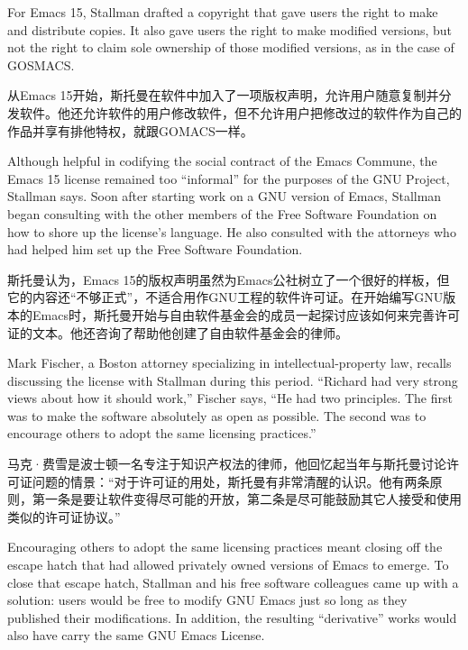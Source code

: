 \ifdefined\eng
For Emacs 15, Stallman drafted a copyright that gave users the right to make and distribute copies. It also gave users the right to make modified versions, but not the right to claim sole ownership of those modified versions, as in the case of GOSMACS.
\fi

\ifdefined\chs
从Emacs 15开始，斯托曼在软件中加入了一项版权声明，允许用户随意复制并分发软件。他还允许软件的用户修改软件，但不允许用户把修改过的软件作为自己的作品并享有排他特权，就跟GOMACS一样。
\fi

\ifdefined\eng
Although helpful in codifying the social contract of the Emacs Commune, the Emacs 15 license remained too ``informal'' for the purposes of the GNU Project, Stallman says. Soon after starting work on a GNU version of Emacs, Stallman began consulting with the other members of the Free Software Foundation on how to shore up the license's language. He also consulted with the attorneys who had helped him set up the Free Software Foundation.
\fi

\ifdefined\chs
斯托曼认为，Emacs 15的版权声明虽然为Emacs公社树立了一个很好的样板，但它的内容还``不够正式''，不适合用作GNU工程的软件许可证。在开始编写GNU版本的Emacs时，斯托曼开始与自由软件基金会的成员一起探讨应该如何来完善许可证的文本。他还咨询了帮助他创建了自由软件基金会的律师。
\fi

\ifdefined\eng
Mark Fischer, a Boston attorney specializing in intellectual-property law, recalls discussing the license with Stallman during this period. ``Richard had very strong views about how it should work,'' Fischer says, ``He had two principles. The first was to make the software absolutely as open as possible. The second was to encourage others to adopt the same licensing practices.''
\fi

\ifdefined\chs
马克·费雪是波士顿一名专注于知识产权法的律师，他回忆起当年与斯托曼讨论许可证问题的情景：``对于许可证的用处，斯托曼有非常清醒的认识。他有两条原则，第一条是要让软件变得尽可能的开放，第二条是尽可能鼓励其它人接受和使用类似的许可证协议。''
\fi

\ifdefined\eng
Encouraging others to adopt the same licensing practices meant closing off the escape hatch that had allowed privately owned versions of Emacs to emerge. To close that escape hatch, Stallman and his free software colleagues came up with a solution: users would be free to modify GNU Emacs just so long as they published their modifications. In addition, the resulting ``derivative'' works would also have carry the same GNU Emacs License.
\fi

